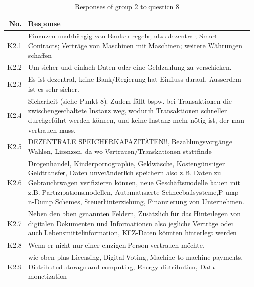 \begin{table}[H]
    \centering
    \begin{tabularx}{\textwidth}{r|X}
         No. & Response \\ \hline
         K2.1 & Finanzen unabhängig von Banken regeln, also dezentral; Smart Contracts; Verträge von Maschinen mit Maschinen; weitere Währungen schaffen\\
         K2.2 & Um sicher und einfach Daten oder eine Geldzahlung zu verschicken. \\
         K2.3 & Es ist dezentral, keine Bank/Regierung hat Einfluss darauf. Ausserdem ist es sehr sicher. \\
         K2.4 & Sicherheit (siehe Punkt 8). Zudem fällt bspw. bei Transaktionen die zwischengeschaltete Instanz weg, wodurch Transaktionen schneller durchgeführt werden können, und keine Instanz mehr nötig ist, der man vertrauen muss.\\
         K2.5 & DEZENTRALE SPEICHERKAPAZITÄTEN!!, Bezahlungsvorgänge, Wahlen, Lizenzen, da wo Vertrauen/Transkationen stattfinde \\
         K2.6 & Drogenhandel, Kinderpornographie, Geldwäsche, Kostengünstiger Geldtransfer, Daten unveränderlich speichern also z.B. Daten zu Gebrauchtwagen verifizieren können, neue Geschäftsmodelle bauen mit z.B. Partizipationsmodellen, Automatisierte Schneeballsysteme,P ump-n-Dump Schemes, Steuerhinterziehung, Finanzierung von Unternehmen.\\
         K2.7 & Neben den oben genannten Feldern, Zusätzlich für das Hinterlegen von digitalen Dokumenten und Informationen also jegliche Verträge oder auch Lebensmittelinformation, KFZ-Daten könnten hinterlegt werden\\
         K2.8 & Wenn er nicht nur einer einzigen Person vertrauen möchte. \\
         K2.9 & wie oben plus Licensing, Digital Voting, Machine to machine payments, Distributed storage and computing, Energy distribution, Data monetization\\
    \end{tabularx}
    \caption{Responses of group 2 to question 8}
    \label{tab:Artefakt8}
\end{table}




